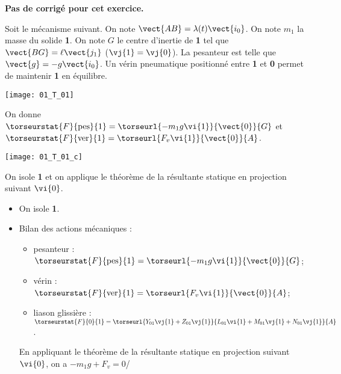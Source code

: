\normaltrue
\correctionfalse


\setcounter{numques}{0}
\ifcorrection
\else
\textbf{Pas de corrigé pour cet exercice.}
\fi


Soit le mécanisme suivant. On note $\vect{AB}=\lambda(t)\vect{i_0}$. On note $m_1$ la masse du solide \textbf{1}.
On note $G$ le centre d'inertie de \textbf{1} tel que $\vect{BG}=\ell \vect{j_1}$ ($\vj{1}=\vj{0}$). La pesanteur est telle que $\vect{g}=-g\vect{i_0}$. Un vérin pneumatique positionné entre \textbf{1} et \textbf{0} permet de maintenir \textbf{1} en équilibre. 
\begin{center}
\texttt{[image: 01\_T\_01]}
\end{center}


On donne 
$\torseurstat{F}{\text{pes}}{1}=\torseurl{-m_1g\vi{1}}{\vect{0}}{G}$ et 
$\torseurstat{F}{\text{ver}}{1}=\torseurl{F_v\vi{1}}{\vect{0}}{A}$.

\ifprof
\begin{center}
\texttt{[image: 01\_T\_01\_c]}
\end{center}
\else
\fi


On isole \textbf{1} et on applique le théorème de la résultante statique en projection suivant $\vi{0}$.

\ifprof
\begin{itemize}
\item On isole \textbf{1}.
\item Bilan des actions mécaniques :
\begin{itemize}
\item pesanteur : $\torseurstat{F}{\text{pes}}{1}=\torseurl{-m_1g\vi{1}}{\vect{0}}{G}$;
\item vérin : $\torseurstat{F}{\text{ver}}{1}=\torseurl{F_v\vi{1}}{\vect{0}}{A}$;
\item liason glissière : $\torseurstat{F}{0}{1}=\torseurl{Y_{01}\vj{1}+Z_{01}\vj{1}}{L_{01}\vi{1}+M_{01}\vj{1}+N_{01}\vj{1}}{A}$.
\end{itemize}
En appliquant le théorème de la résultante statique en projection suivant $\vi{0}$, on a $-m_1g+F_v = 0$/ 

\end{itemize}
\else
\fi

